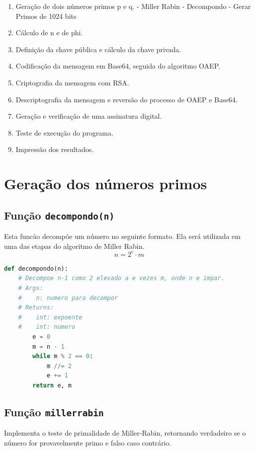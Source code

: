 \documentclass{article}
\begin{document}
\begin{enumerate}
    \item Geração de dois números primos p e q.
    \subitem - Miller Rabin
    \subsubitem - Decompondo
    \subitem - Gerar Primos de 1024 bits
    \item Cálculo de n e de phi.
    \item Definição da chave pública e cálculo da chave privada.
    \item Codificação da mensagem em Base64, seguida do algoritmo OAEP.
    \item Criptografia da mensagem com RSA.
    \item Descriptografia da mensagem e reversão do processo de OAEP e Base64.
    \item Geração e verificação de uma assinatura digital.
    \item Teste de execução do programa.
    \item Impressão dos resultados.
\end{enumerate}

\section{Geração dos números primos}
\subsection*{Função \texttt{decompondo(n)}}
Esta funcão decompõe um número no seguinte formato. Ela será utilizada em uma das etapas do algoritmo 
de Miller Rabin.
\[
n = 2^ e \cdot m
\]

\begin{lstlisting}[language=Python]
def decompondo(n):
    # Decompoe n-1 como 2 elevado a e vezes m, onde n e impar.
    # Args:
    #    n: numero para decompor
    # Returns:
    #    int: expoente
    #    int: numero
        e = 0
        m = n - 1
        while m % 2 == 0:
            m //= 2        
            e += 1
        return e, m
\end{lstlisting}

\subsection{Função \texttt{miller\textunderscore rabin}}
Implementa o teste de primalidade de Miller-Rabin, retornando verdadeiro se o número for provavelmente primo e falso caso contrário.
\end{document}
